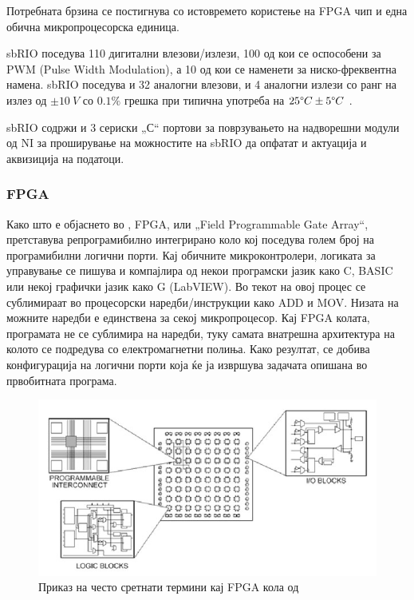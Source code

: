 \documentclass[12pt]{article}
\begin{document}
	  Потребната брзина се постигнува со истовремето користење на FPGA чип и една обична микропроцесорска единица.

	  sbRIO поседува 110 дигитални влезови/излези, 100 од кои се оспособени за PWM (Pulse Width Modulation), а 10 од кои се наменети за ниско-фреквентна намена. sbRIO поседува и 32 аналогни влезови, и 4 аналогни излези со ранг на излез од $ \pm 10\ V$ со $0.1\%$ грешка при типична употреба на $25\degree C \pm5\degree C$ \cite{sbrio}.

	  sbRIO содржи и 3 сериски „С“ портови за поврзувањето на надворешни модули од NI за проширување на можностите на sbRIO да опфатат и актуација и аквизиција на податоци.

	  \subsubsection{FPGA}
		  Како што е објаснето во \cite{fpga}, FPGA, или „Field Programmable Gate Array“, претставува репрограмибилно интегрирано коло кој поседува голем број на програмибилни логични порти. Кај обичните микроконтролери, логиката за управување се пишува и компајлира од некои програмски јазик како C, BASIC или некој графички јазик како G (LabVIEW). Во текот на овој процес се сублимираат во процесорски наредби/инструкции како ADD и MOV. Низата на можните наредби е единствена за секој микропроцесор. Кај FPGA колата, програмата не се сублимира на наредби, туку самата внатрешна архитектура на колото се подредува со електромагнетни полиња. Како резултат, се добива конфигурација на логични порти која ќе ја извршува задачата опишана во првобитната програма.

		  \begin{figure}[H]
			  \includegraphics[width=0.75\linewidth]{./images/fpga_diagram.jpg}
		  	\centering
		  	\caption{Приказ на често сретнати термини кај FPGA кола од \cite{experiments}}
		  	\label{fig:fpga_diagram_jpg}
		  	\end{figure}
\end{document}

